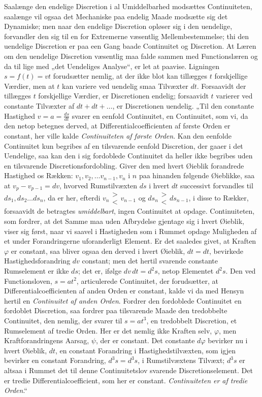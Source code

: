 \documentclass[12pt]{book}
\newcommand{\opage}[1]{\marginnote{\footnotesize\textit{[#1]}}}
\newcommand{\apage}[1]{\marginnote{\footnotesize\textit{[#1]}}}
\begin{document}
Saalænge den endelige Discretion i al Umiddelbarhed modsættes Continuiteten, saalænge vil
ogsaa det Mechaniske paa endelig Maade modsætte sig det Dynamiske; men naar den endelige
Discretion opløser sig i den uendelige, forvandler den sig til en for Extremerne væsentlig
Mellembestemmelse; thi den uendelige Discretion er paa een Gang baade Continuitet og
Discretion. At Læren om den uendelige Discretion væsentlig maa falde sammen med
Functionslæren og da til\-%
lige med „det Uendeliges Analyse“, er let at paavise. \apage{362} Ligningen $s = f(t) = vt$ forudsætter
nemlig, at der ikke blot kan tillægges $t$ forskjellige Værdier, men at $t$ kan variere ved
uendelig smaa Tilvæxter $dt$. Forsaavidt der tillægges $t$ forskjellige Værdier, er
Discretionen endelig; forsaavidt $t$ varierer ved constante Tilvæxter af $dt + dt + \ldots$,
er Discretionen uendelig. „Til den constante Hastighed $v = a = \frac{ds}{dt}$ svarer en
eenfold Continuitet, en Continuitet, som vi, da den netop betegnes derved, at
Differentialcoefficienten af første Orden er constant, her ville kalde \emph{Continuiteten
af første Orden}. Kan den eenfolde Continuitet kun begribes af en tilsvarende eenfold
Discretion, der gaaer i det Uendelige, saa kan den i sig fordoblede Continuitet da heller
ikke begribes uden en tilsvarende Discretionsfordobling. Giver den med hvert Øieblik
forandrede Hastighed os Rækken: $v_{1}, v_{2}, \ldots v_{n-1}, v_{n}$ i $n$ paa hinanden
følgende Øieblikke, saa at $v_{p} - v_{p-1} = dv$, hvorved Rumstilvæxten $ds$ i hvert $dt$
successivt forvandles til $ds_{1}, ds_{2} \ldots ds_{n}$, da er her, efterdi
$v_{n} \mathrel{\substack{\textstyle> \\ \textstyle<}} v_{n-1}$ og $ds_{n} \mathrel{\substack{\textstyle> \\ \textstyle<}} ds_{n-1}$, i disse to Rækker, forsaavidt de
betragtes \emph{umiddelbart}, ingen Continuitet at opdage. Continuiteten, som fordrer, at
det Samme maa uden Afbrydelse gjentage sig i hvert Øieblik, viser sig først, naar vi saavel
i Hastigheden som i Rummet opdage Muligheden af et under Forandringerne uforanderligt
Element. Er det saaledes givet, at Kraften $\varphi$ er constant, saa bliver ogsaa den
derved i hvert Øieblik, $dt = dt$, bevirkede Hastighedsforandring $dv$ constant; men det
hertil svarende constante Rumselement er ikke $ds$; det er, ifølge $dv\,dt = d^{2}s$, netop
Elementet $d^{2}s$. Den ved Functionsloven, $s = at^{2}$, articulerede Continuitet, der
forudsætter, at Differentialcoefficienten af anden Orden er constant, kalde vi da med Hensyn
hertil en \emph{Continuitet af anden Orden}. Fordrer den fordoblede Continuitet en fordoblet
\opage{363} Discretion, saa fordrer paa tilsvarende Maade den tredobbelte Continuitet, den nemlig, der
svarer til $s = at^{3}$, en tredobbelt Discretion, et Rumselement af tredie Orden. Her er
det nemlig ikke Kraften selv, $\varphi$, men Kraftforandringens Aarsag, $\psi$, der er
constant. Det constante $d\varphi$ bevirker nu i hvert Øieblik, $dt$, en constant Forandring
i Hastighedstilvæxten, som igjen bevirker en constant Forandring, $d^{3}s = d^{3}s$, i
Rumstilvæxtens Tilvæxt; $d^{3}s$ er altsaa i Rummet det til denne Continuitetslov svarende
Discretionselement. Det er tredie Differentialcoefficient, som her er constant.
\emph{Continuiteten er af tredie Orden}.“
\end{document}
